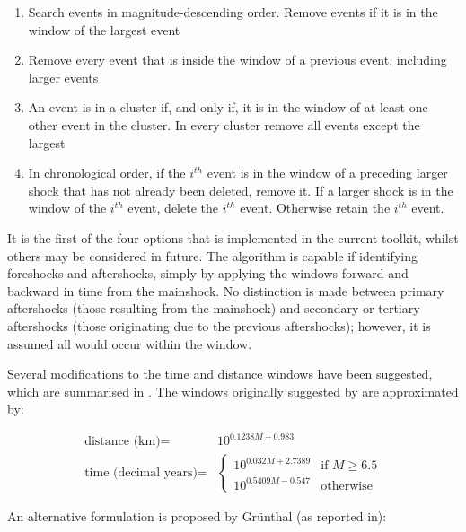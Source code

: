 \begin{enumerate}
\item Search events in magnitude-descending order. Remove events if it is 
    in the window of the largest event
\item Remove every event that is inside the window of a previous event, 
    including larger events
\item An event is in a cluster if, and only if, it is in the window of at 
    least one other event in the cluster. In every cluster remove all 
    events except the largest
\item In chronological order, if the $i^{th}$ event is in the window of a 
    preceding larger shock that has not already been deleted, remove it. 
    If a larger shock is in the window of the $i^{th}$ event, delete the 
    $i^{th}$ event. Otherwise retain the $i^{th}$ event.
\end{enumerate}

It is the first of the four options that is implemented in the current 
toolkit, whilst others may be considered in future.  The algorithm is 
capable if identifying foreshocks and aftershocks, simply by applying 
the windows forward and backward in time from the mainshock. 
No distinction is made between primary aftershocks (those resulting 
from the mainshock) and secondary or tertiary aftershocks (those 
originating due to the previous aftershocks); however, it is assumed 
all would occur within the window.

Several modifications to the time and distance windows have been 
suggested, which are summarised in \cite{vanStiphout2012}. The windows 
originally suggested by \cite{GardnerKnopoff1974} are approximated by:

\begin{equation}\begin{split} 
\mbox{distance (km)} = &10^{0.1238 M + 0.983}\\
\mbox{time (decimal years)} = & 
\begin{cases} 10^{0.032 M + 2.7389} & \text{if $M \geq 6.5$} \\ 
              10^{0.5409 M - 0.547} & \mbox{otherwise}  \end{cases}\end{split}
\end{equation}

An alternative formulation is proposed by Gr\"unthal (as reported in\cite{vanStiphout2012}):

